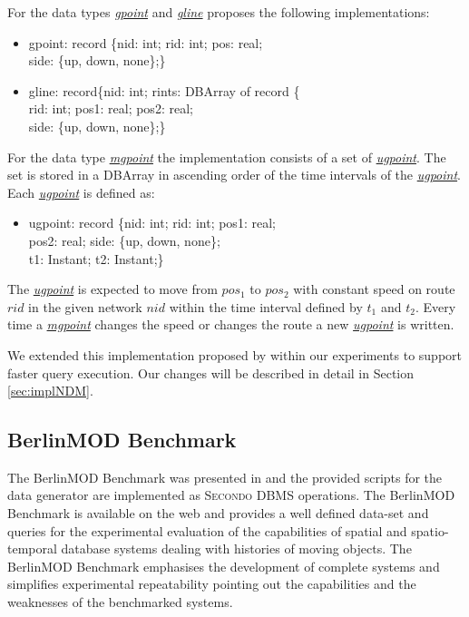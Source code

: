 \documentclass[a4paper]{article}
\newcommand{\secondo}{\textsc{Secondo}}
\newcommand{\bmodb} {BerlinMOD Benchmark}
\newcommand{\dt}[1]{\textsl{\underline{#1}}}
\begin{document}
For the data types \dt{gpoint} and \dt{gline} \cite{NetworkGueting} proposes
the following implementations:
\begin{ttfamily}
\begin{itemize}
  \item [] gpoint: record \{nid: int; rid: int; pos: real;\\
side: \{up, down, none\};\}
  \item [] gline: record\{nid: int; rints: DBArray of record \{\\
rid: int; pos1: real; pos2: real;\\
side: \{up, down, none\};\}
\end{itemize}
\end{ttfamily}
For the data type \dt{mgpoint} the implementation consists of a set of \dt{ugpoint}.
The set is stored in a DBArray in ascending order of the time intervals of the
\dt{ugpoint}. Each \dt{ugpoint} is defined as:
\begin{ttfamily}
\begin{itemize}
  \item [] ugpoint: record \{nid: int; rid: int; pos1: real;\\
pos2: real; side: \{up, down, none\};\\
t1: Instant; t2: Instant;\}
\end{itemize}
\end{ttfamily}
The \dt{ugpoint} is expected to move from $pos_1$ to $pos_2$ with constant speed on
route $rid$ in the given network $nid$ within the time interval defined by $t_1$
and $t_2$. Every time a \dt{mgpoint} changes the speed or changes the route a new
\dt{ugpoint} is written.

We extended this implementation proposed by \cite{NetworkGueting} within our
experiments to support faster query execution. Our changes will be described in
detail in Section \ref{sec:implNDM}.
\subsection{BerlinMOD Benchmark}
\label{sec:bmodb}
The \bmodb{} was presented in \cite{BerlinMODVLDBDuentgen} and the
provided scripts for the data generator are implemented as \secondo{} DBMS
operations.
The \bmodb{} is available on the web \cite{berlinmodweb} and provides a well defined
data-set and queries for the experimental evaluation of the capabilities of
spatial and spatio-temporal database systems dealing with histories of moving
objects. The \bmodb{} emphasises the development of complete systems
and simplifies experimental repeatability pointing out the capabilities and the
weaknesses of the benchmarked systems.
\end{document}

